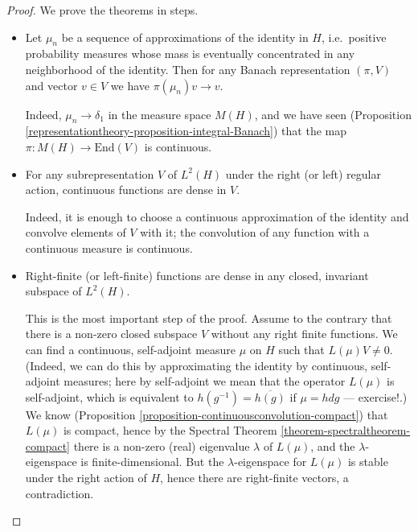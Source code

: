 \begin{proof}
 We prove the theorems in steps. 

\begin{itemize}
 \item Let $\mu_n$ be a sequence of approximations of the identity in $H$, i.e.\ positive probability measures whose mass is eventually concentrated in any neighborhood of the identity. Then for any Banach representation $(\pi,V)$ and vector $v\in V$ we have $\pi(\mu_n)v\to v$.
 
 Indeed, $\mu_n\to \delta_1$ in the measure space $M(H)$, and we have seen (Proposition \ref{representationtheory-proposition-integral-Banach}) that the map $\pi: M(H)\to \text{End}(V)$ is continuous.

 
 \item For any subrepresentation $V$ of $L^2(H)$ under the right (or left) regular action, continuous functions are dense in $V$. 

Indeed, it is enough to choose a continuous approximation of the identity and convolve elements of $V$ with it; the convolution of any function with a continuous measure is continuous.

\item Right-finite (or left-finite) functions are dense in any closed, invariant subspace of $L^2(H)$. 

This is the most important step of the proof. Assume to the contrary that there is a non-zero closed subspace $V$ without any right finite functions. We can find a continuous, self-adjoint measure $\mu$ on $H$ such that $L(\mu)V\ne 0$. (Indeed, we can do this by approximating the identity by continuous, self-adjoint measures; here by self-adjoint we mean that the operator $L(\mu)$ is self-adjoint, which is equivalent to $h(g^{-1})=\overline{h(g)}$ if $\mu=hdg$ --- exercise!.) We know (Proposition \ref{proposition-continuousconvolution-compact}) that $L(\mu)$ is compact, hence by the Spectral Theorem \ref{theorem-spectraltheorem-compact} there is a non-zero (real) eigenvalue $\lambda$ of $L(\mu)$, and the $\lambda$-eigenspace is finite-dimensional. But the $\lambda$-eigenspace for $L(\mu)$ is stable under the right action of $H$, hence there are right-finite vectors, a contradiction.

\end{itemize}


\end{proof}
